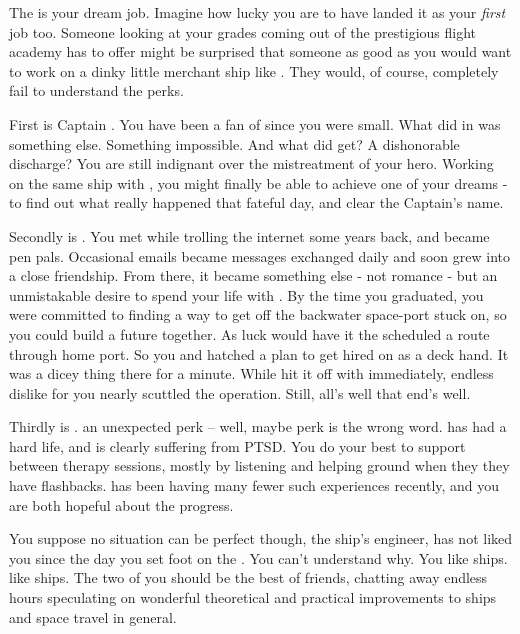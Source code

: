 \documentclass[char]{TMFHope}
\begin{document}
\name{\cNav{}}

The \pNew{} is your dream job. Imagine how lucky you are to have landed it as your {\em first} job too. Someone looking at your grades coming out of the prestigious flight academy \pHome{} has to offer might be surprised that someone as good as you would want to work on a dinky little merchant ship like \pNew{}. They would, of course, completely fail to understand the perks.

First is Captain \cCap{\full}. You have been a fan\cNav{\kid} of \cCap{\theirs} since you were small. What \pOld{} did in \pBattle{} was something else. Something impossible. And what did \cCap{} get? A dishonorable discharge? You are still indignant over the mistreatment of your hero. Working on the same ship with \cCap{\them}, you might finally be able to achieve one of your dreams - to find out what really happened that fateful day, and clear the Captain's name.

Secondly is \cBoy{\full}. You met while trolling the internet some years back, and became pen pals. Occasional emails became messages exchanged daily and soon grew into a close friendship. From there, it became something else - not romance - but an unmistakable desire to spend your life with \cBoy{\them}. By the time you graduated, you were committed to finding a way to get \cBoy{} off the backwater space-port \cBoy{\they} \cBoy{\were} stuck on, so you could build a future together. As luck would have it the \pNew{} scheduled a route through \cBoy{\their} home port. So you and \cBoy{} hatched a plan to get \cBoy{\them} hired on as a deck hand. It was a dicey thing there for a minute. While \cEng{} hit it off with \cBoy{} immediately, \cEng{\their} endless dislike for you nearly scuttled the operation. Still, all's well that end's well.

Thirdly is \cWeap{}. \cWeap{\They} \cWeap{\are} an unexpected perk -- well, maybe perk is the wrong word. \cWeap{} has had a hard life, and is clearly suffering from PTSD. You do your best to support \cWeap{\them} between \cWeap{\their} therapy sessions, mostly by listening and helping \cWeap{\them} ground when they they have flashbacks. \cWeap{} has been having many fewer such experiences recently, and you are both hopeful about the progress.

You suppose no situation can be perfect though, the ship's engineer, \cEng{} has not liked you since the day you set foot on the \pNew{}. You can't understand why. You like ships. \cEng{\They} like ships. The two of you should be the best of friends, chatting away endless hours speculating on wonderful theoretical and practical improvements to ships and space travel in general.
\end{document}
